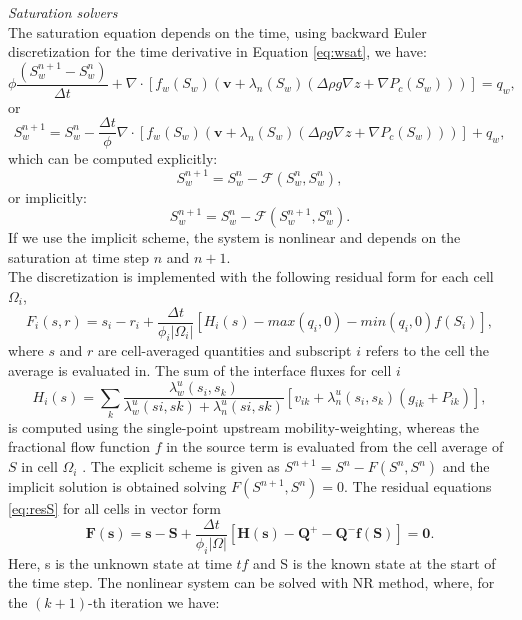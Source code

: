 \documentclass[a4paper,10pt]{report}
\begin{document}
\emph{Saturation solvers}\\
The saturation equation depends on the time, using backward Euler discretization for the time derivative in Equation \ref{eq:wsat}, we have:
\begin{equation}\label{eq:wsat1}
 \phi\frac{( {S}_{w}^{n+1}-{S}_{w}^n)}{\Delta t}+\nabla \cdot [f_w({S}_{w})( \mathbf{v}+\lambda_n({S}_{w})(\Delta  \rho g\nabla z+\nabla P_c({S}_{w})))]= q_w,
\end{equation}
or
\begin{equation*}\label{eq:wsat2}
 {S}_{w}^{n+1}={S}_{w}^n-\frac{\Delta t}{\phi}\nabla \cdot [f_w({S}_{w})( \mathbf{v}+\lambda_n({S}_{w})(\Delta  \rho g\nabla z+\nabla P_c({S}_{w})))]+q_w,
\end{equation*}
which can be computed explicitly:
\begin{equation*}\label{eq:wsat3}
 {S}_{w}^{n+1}={S}_{w}^n-\mathcal{F}({S}_{w}^{n},{S}_{w}^{n}),
\end{equation*}
or implicitly:
\begin{equation*}\label{eq:wsat4}
 {S}_{w}^{n+1}={S}_{w}^n-\mathcal{F}({S}_{w}^{n+1},{S}_{w}^{n}).
\end{equation*}
If we use the implicit scheme, the system is nonlinear and depends on the saturation at time step $n$ and $n+1$.\\
The discretization is implemented with the following residual form for each cell $\Omega_i$,
\begin{equation}\label{eq:resS}
 F_i (s, r) = s_i − r_i +\frac{\Delta t}{\phi_i|\Omega_i|}[H_i (s) − max(q_i, 0) − min(q_i , 0)f (S_i )],
\end{equation}
where $s$ and $r$ are cell-averaged quantities and subscript $i$ refers to
the cell the average is evaluated in. The sum of the interface fluxes for cell $i$ 
\begin{equation}
 H_i (s) =\sum_k \frac{\lambda^u_w (s_i , s_k )}{\lambda^u_w (si , sk ) + \lambda^u_n (si , sk )}[v_{ik} + \lambda^u_n (s_i , s_k )(g_{ik} + P_{ik} )],
\end{equation}
is computed using the single-point upstream mobility-weighting, whereas the fractional flow function $f$ in the source term
is evaluated from the cell average of $S$ in cell $\Omega_i$ . The explicit scheme is given
as $S^{n+1} = S^n −F(S^n , S^n )$ and the implicit solution is obtained solving $F(S^{n+1} , S^{ n}) = 0$. 
The residual equations \eqref{eq:resS} for all cells in vector form
\begin{equation}
 \mathbf{F} (\mathbf{s}) = \mathbf{s} − \mathbf{S} +\frac{\Delta t}{\phi_i|\Omega|}[\mathbf{H} (\mathbf{s}) − \mathbf{Q}^+ − \mathbf{Q}^-\mathbf{f} (\mathbf{S} )]=\mathbf{0}.
\end{equation}
Here, s is the unknown state at time $tf$ and S is the known state at the start
of the time step. The nonlinear system can be solved with NR method, where, for the $(k+1)$-th iteration we have:
\end{document}

